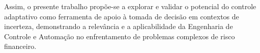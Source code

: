 Assim, o presente trabalho propõe-se a explorar e validar o potencial do controle adaptativo como ferramenta de apoio à tomada de decisão em contextos de incerteza, demonstrando a relevância e a aplicabilidade da Engenharia de Controle e Automação no enfrentamento de problemas complexos de risco financeiro.